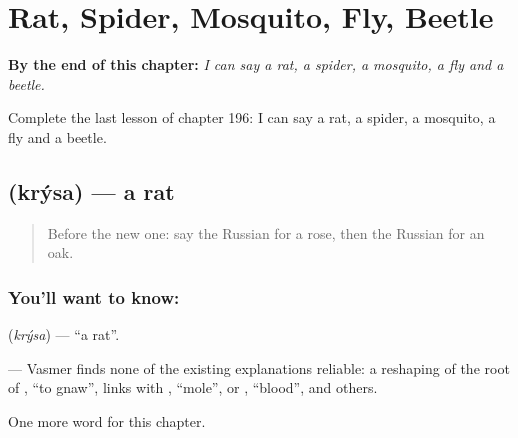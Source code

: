 
\chapter{Rat, Spider, Mosquito, Fly, Beetle}
\label{ch:ru-rat-spider-mosquito-fly-beetle}

\begin{chapteropening}
\textbf{By the end of this chapter:} \emph{I can say a rat, a spider, a mosquito, a fly and a beetle.}

Complete the last lesson of chapter 196: I can say a rat, a spider, a mosquito, a fly and a beetle.
\end{chapteropening}

\section[\texorpdfstring{\ru{крыса} (krýsa)}{крыса (krýsa)}]{ (krýsa) — a rat}

\label{lesson:RU-C196-krysa}



\begin{quote}
Before the new one: say the Russian for a rose, then the Russian for an oak.
\end{quote}

\subsection*{You'll want to know: }
\textbf{} (\emph{krýsa}) — \textquotedblleft{}a rat\textquotedblright{}.

\begin{cousinweb}
\textbf{} — Vasmer finds none of the existing explanations reliable: a reshaping of the root of \emph{}, \textquotedblleft{}to gnaw\textquotedblright{}, links with \emph{}, \textquotedblleft{}mole\textquotedblright{}, or \emph{}, \textquotedblleft{}blood\textquotedblright{}, and others.
\end{cousinweb}

\begin{grammarlens}[title={What you've built}]
One more word for this chapter.
\end{grammarlens}

